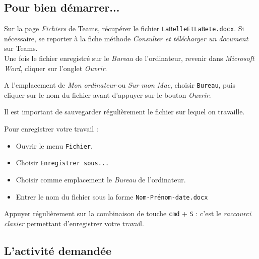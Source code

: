 \subsection{Pour bien démarrer...}

Sur la page \emph{Fichiers} de Teams, récupérer le fichier \texttt{LaBelleEtLaBete.docx}. Si nécessaire, se reporter à la fiche méthode \emph{Consulter et télécharger un document} sur Teams.\\

Une fois le fichier enregistré sur le \emph{Bureau} de l'ordinateur, revenir dans \emph{Microsoft Word}, cliquer sur l'onglet \emph{Ouvrir}.


A l'emplacement de \emph{Mon ordinateur} ou \emph{Sur mon Mac}, choisir \texttt{Bureau}, puis cliquer sur le nom du fichier avant d'appuyer sur le bouton \emph{Ouvrir}.      






Il est important de sauvegarder régulièrement le fichier sur lequel on travaille.

Pour enregistrer votre travail :
\begin{itemize}
\item Ouvrir le menu \texttt{Fichier}.
\item Choisir \texttt{Enregistrer sous...}
\item Choisir comme emplacement le \emph{Bureau} de l'ordinateur.
\item Entrer le nom du fichier sous la forme \texttt{Nom-Prénom-date.docx}
\end{itemize}


Appuyer régulièrement sur la combinaison de touche \texttt{cmd} + \texttt{S} : c'est le \emph{raccourci clavier} permettant d'enregistrer votre travail.



\subsection{L'activité demandée}

\vspace{10pt}


